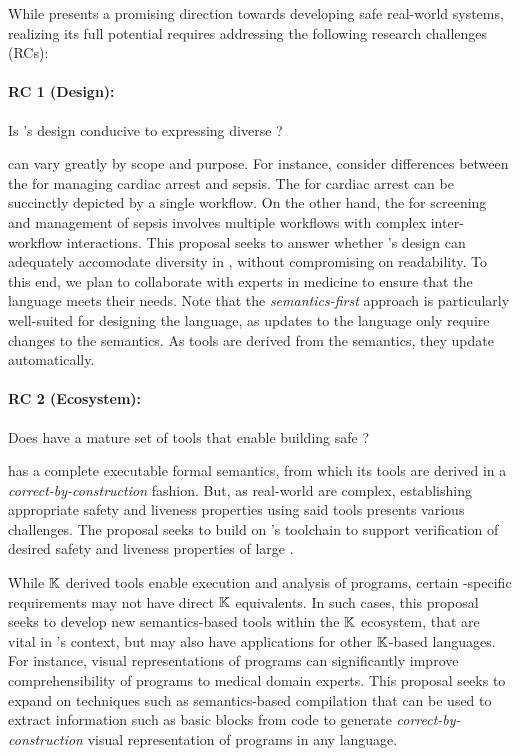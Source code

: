 While \MediK{} presents a promising direction towards developing safe real-world
systems, realizing its full potential requires addressing the following research
challenges (RCs):

\paragraph{RC 1 (Design):} Is \MediK{}'s design conducive to expressing diverse \BPGs{}?

\BPGs{} can vary greatly by scope and purpose. For instance,
consider differences between the \BPGs{} for managing cardiac
arrest and sepsis. The \BPG{} for cardiac arrest can be
succinctly depicted by a single workflow. On the other hand, the \BPG{} for
screening and management of sepsis involves multiple workflows with complex
inter-workflow interactions.
This proposal seeks to answer whether \MediK{}'s
design can adequately accomodate diversity in \BPGs{}, without
compromising on readability. To this end, we plan to collaborate with
experts in medicine to ensure that the language meets their needs.
Note that the \emph{semantics-first} approach is particularly
well-suited for designing the language, as updates to the language
only require changes to the semantics. As tools are derived from the semantics,
they update automatically.

\paragraph{RC 2 (Ecosystem):} Does \MediK{} have a mature
set of tools that enable building safe \CDSSs{}?

\MediK{} has a complete executable formal semantics, from which
its tools are derived in a \emph{correct-by-construction} fashion.
But, as real-world \BPGs{} are complex, establishing appropriate safety and liveness properties using
said tools presents various challenges. The proposal seeks to build on
\MediK{}'s toolchain to support verification of desired safety and liveness
properties of large \BPGs{}.

While $\mathbb{K}$ derived tools enable execution and analysis of \MediK{} programs,
certain \BPG{}-specific requirements may not have direct $\mathbb{K}{}$ equivalents.
In such cases, this proposal seeks to develop new semantics-based tools within
the $\mathbb{K}{}$ ecosystem, that are vital in \MediK's context, but may also have
applications for other $\mathbb{K}$-based languages.
For instance, visual representations of \MediK{} programs can
significantly improve comprehensibility of \MediK{} programs to medical domain
experts. This proposal seeks to expand on techniques
such as semantics-based compilation that can be used to extract information such
as basic blocks from code to generate \emph{correct-by-construction} visual
representation of programs in any language.

